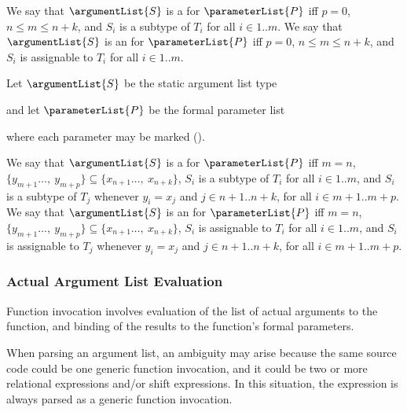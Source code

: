 \documentclass[makeidx]{article}
\begin{document}
\LMHash{}%
We say that $\argumentList{S}$ is
a  for $\parameterList{P}$
if{}f $p = 0$, $n \leq m \leq n+k$, and $S_i$ is a subtype of $T_i$ for all $i \in 1 .. m$.
We say that $\argumentList{S}$ is
an  for $\parameterList{P}$
if{}f $p = 0$, $n \leq m \leq n+k$, and $S_i$ is assignable to $T_i$ for all $i \in 1 .. m$.

\LMHash{}%
Let $\argumentList{S}$ be the static argument list type


\noindent
and let $\parameterList{P}$ be the formal parameter list


\noindent
where each parameter may be marked \COVARIANT{} ().

\LMHash{}%
We say that $\argumentList{S}$ is
a  for $\parameterList{P}$
if{}f $m = n$,
$\{y_{m+1}\ldots,\ y_{m+p}\} \subseteq \{x_{n+1}\ldots,\ x_{n+k}\}$,
$S_i$ is a subtype of $T_i$ for all $i \in 1 .. m$,
and $S_i$ is a subtype of $T_j$ whenever $y_i = x_j$ and
$j \in n + 1 .. n + k$, for all
$i \in m + 1 .. m + p$.
We say that $\argumentList{S}$
is an  for $\parameterList{P}$
if{}f $m = n$,
$\{y_{m+1}\ldots,\ y_{m+p}\} \subseteq \{x_{n+1}\ldots,\ x_{n+k}\}$,
$S_i$ is assignable to $T_i$ for all $i \in 1 .. m$,
and $S_i$ is assignable to $T_j$ whenever $y_i = x_j$ and
$j \in n + 1 .. n + k$, for all
$i \in m + 1 .. m + p$.



\subsubsection{Actual Argument List Evaluation}

\LMHash{}%
Function invocation involves evaluation of the list of actual arguments to the function,
and binding of the results to the function's formal parameters.

\LMHash{}%
When parsing an argument list, an ambiguity may arise because the same source code could be one generic function invocation,
and it could be two or more relational expressions and/or shift expressions.
In this situation, the expression is always parsed as a generic function invocation.
\end{document}
